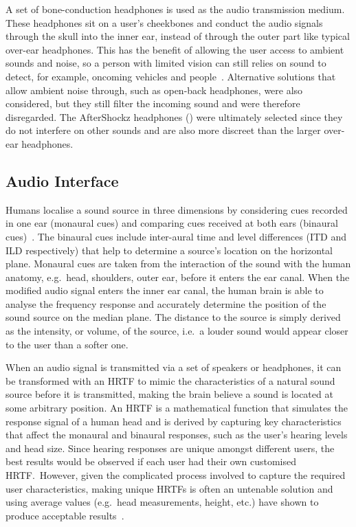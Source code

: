 \documentclass[]{interact}
\begin{document}
A set of bone-conduction headphones is used as the audio transmission medium.
These headphones sit on a user's cheekbones and conduct the audio signals through the skull into the inner ear, instead of through the outer part like typical over-ear headphones. 
This has the benefit of allowing the user access to ambient sounds and noise, so a person with limited vision can still relies on sound to detect, for example, oncoming vehicles and people~\citep{lichtenstein2012headphone}.
Alternative solutions that allow ambient noise through, such as open-back headphones, were also considered, but they still filter the incoming sound and were therefore disregarded.
The AfterShockz headphones () were ultimately selected since they do not interfere on other sounds and are also more discreet than the larger over-ear headphones. 

\subsection{Audio Interface}

Humans localise a sound source in three dimensions by considering cues recorded in one ear (monaural cues) and comparing cues received at both ears (binaural cues)~\citep{blauert1997spatial,blauert1969sound}.
The binaural cues include inter-aural time and level differences (ITD and ILD respectively) that help to determine a source's location on the horizontal plane.
Monaural cues are taken from the interaction of the sound with the human anatomy, e.g.\ head, shoulders, outer ear, before it enters the ear canal.
When the modified audio signal enters the inner ear canal, the human brain is able to analyse the frequency response and accurately determine the position of the sound source on the median plane. 
The distance to the source is simply derived as the intensity, or volume, of the source, i.e.\ a louder sound would appear closer to the user than a softer one. 

When an audio signal is transmitted via a set of speakers or headphones, it can be transformed with an HRTF to mimic the characteristics of a natural sound source before it is transmitted, making the brain believe a sound is located at some arbitrary position.
An HRTF is a mathematical function that simulates the response signal of a human head and is derived by capturing key characteristics that affect the monaural and binaural responses, such as the user's hearing levels and head size.
Since hearing responses are unique amongst different users, the best results would be observed if each user had their own customised HRTF.\
However, given the complicated process involved to capture the required user characteristics, making unique HRTFs is often an untenable solution and using average values (e.g.\ head measurements, height, etc.) have shown to produce acceptable results~\citep{gardner1995hrtf}.
\end{document}
